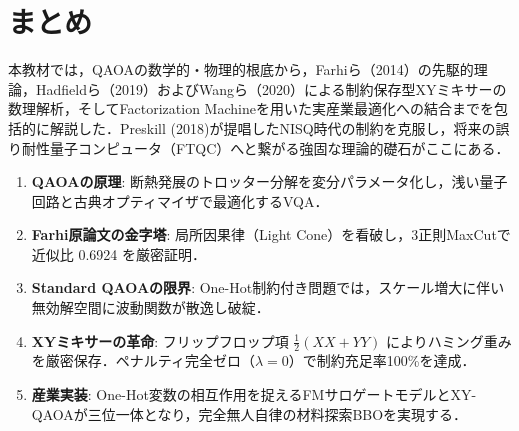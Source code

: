 \documentclass[11pt,a4paper,oneside,openany]{ltjsbook}
\theoremstyle{definition}
\theoremstyle{plain}
\theoremstyle{remark}
\newenvironment{pointbox}[1][]{\begin{insightbox}[#1]}{\end{insightbox}}
\begin{document}
\chapter{まとめ}

本教材では，QAOAの数学的・物理的根底から，Farhiら（2014）\cite{farhi2014quantum}の先駆的理論，Hadfieldら（2019）\cite{hadfield2019from}およびWangら（2020）\cite{wang2020xy}による制約保存型XYミキサーの数理解析，そしてFactorization Machineを用いた実産業最適化への結合\cite{kitai2020designing}までを包括的に解説した．Preskill (2018)\cite{preskill2018quantum}が提唱したNISQ時代の制約を克服し，将来の誤り耐性量子コンピュータ（FTQC）へと繋がる強固な理論的礎石がここにある．

\begin{pointbox}[本教材の要点総括]
\begin{enumerate}\setlength{\itemsep}{0pt}\setlength{\parskip}{0pt}
    \item \textbf{QAOAの原理}: 断熱発展のトロッター分解を変分パラメータ化し，浅い量子回路と古典オプティマイザで最適化するVQA．
    \item \textbf{Farhi原論文の金字塔}: 局所因果律（Light Cone）を看破し，3正則MaxCutで近似比 0.6924 を厳密証明．
    \item \textbf{Standard QAOAの限界}: One-Hot制約付き問題では，スケール増大に伴い無効解空間に波動関数が散逸し破綻．
    \item \textbf{XYミキサーの革命}: フリップフロップ項 $\frac{1}{2}(XX+YY)$ によりハミング重みを厳密保存．ペナルティ完全ゼロ（$\lambda=0$）で制約充足率100\%を達成．
    \item \textbf{産業実装}: One-Hot変数の相互作用を捉えるFMサロゲートモデルとXY-QAOAが三位一体となり，完全無人自律の材料探索BBOを実現する．
\end{enumerate}
\end{pointbox}
\end{document}
